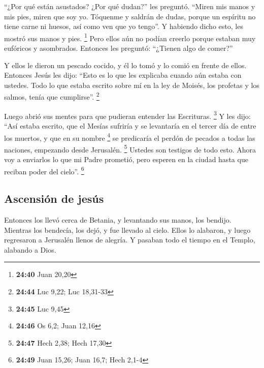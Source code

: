  ``¿Por qué están asustados? ¿Por qué dudan?'' les
preguntó.  ``Miren mis manos y mis pies, miren que soy
yo. Tóquenme y saldrán de dudas, porque un espíritu no tiene carne ni
huesos, así como ven que yo tengo''.  Y habiendo dicho
esto, les mostró sus manos y pies. \footnote{\textbf{24:40} Juan 20,20}
 Pero ellos aún no podían creerlo porque estaban muy
eufóricos y asombrados. Entonces les preguntó: ``¿Tienen algo de
comer?''

 Y ellos le dieron un pescado cocido,  y
él lo tomó y lo comió en frente de ellos.  Entonces Jesús
les dijo: ``Esto es lo que les explicaba cuando aún estaba con ustedes.
Todo lo que estaba escrito sobre mí en la ley de Moisés, los profetas y
los salmos, tenía que cumplirse''. \footnote{\textbf{24:44} Luc 9,22;
  Luc 18,31-33}

 Luego abrió sus mentes para que pudieran entender las
Escrituras. \footnote{\textbf{24:45} Luc 9,45}  Y les
dijo: ``Así estaba escrito, que el Mesías sufriría y se levantaría en el
tercer día de entre los muertos, y que en su nombre \footnote{\textbf{24:46}
  Os 6,2; Juan 12,16}  se predicaría el perdón de pecados
a todas las naciones, empezando desde Jerusalén. \footnote{\textbf{24:47}
  Hech 2,38; Hech 17,30}  Ustedes son testigos de todo
esto.  Ahora voy a enviarlos lo que mi Padre prometió,
pero esperen en la ciudad hasta que reciban poder del cielo''.
\footnote{\textbf{24:49} Juan 15,26; Juan 16,7; Hech 2,1-4}

\hypertarget{ascensiuxf3n-de-jesuxfas}{%
\subsection{Ascensión de jesús}\label{ascensiuxf3n-de-jesuxfas}}

 Entonces los llevó cerca de Betania, y levantando sus
manos, los bendijo.  Mientras los bendecía, los dejó, y
fue llevado al cielo.  Ellos lo alabaron, y luego
regresaron a Jerusalén llenos de alegría.  Y pasaban todo
el tiempo en el Templo, alabando a Dios.
